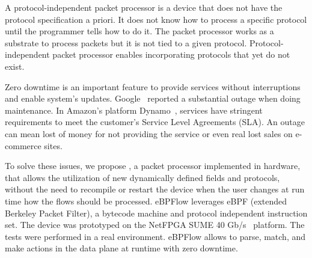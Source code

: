 A protocol-independent packet processor is a device that does not have the protocol specification a priori. It does not know how to process a specific protocol until the programmer tells how to do it. The packet processor works as a substrate to process packets but it is not tied to a given protocol. Protocol-independent packet processor enables incorporating protocols that yet do not exist.


Zero downtime is an important feature to provide services without interruptions and enable system's updates.
Google~\cite{Jain:2013:BEG:2486001.2486019} reported a substantial outage when doing maintenance. In  Amazon's platform Dynamo~\cite{DeCandia:2007:DAH:1294261.1294281},  services have stringent requirements to meet the customer's Service Level Agreements (SLA).
An outage can mean lost of money for not providing the service or even real lost sales on e-commerce sites.


To solve these issues, we propose \system, a packet processor implemented in hardware, that allows the utilization of new dynamically defined fields and protocols, without the need to recompile or restart the device when the user changes at run time how the flows should be processed. 
eBPFlow leverages eBPF (extended Berkeley Packet Filter), a bytecode machine and protocol independent instruction set. %
The device was prototyped on the NetFPGA SUME 40 Gb/s~\cite{SUME2014} platform. The tests were performed in a real environment. eBPFlow allows to parse, match, and make actions in the data plane at runtime with zero downtime.



